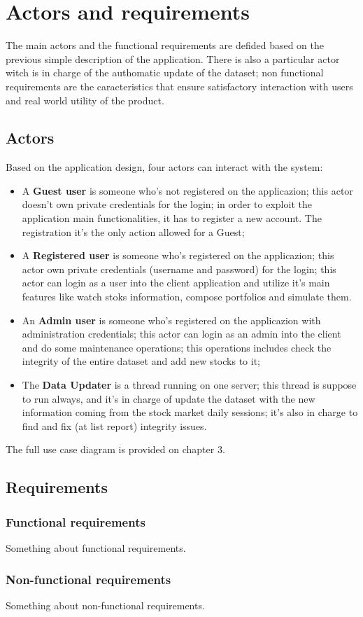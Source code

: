 \chapter{Actors and requirements}
The main actors and the functional requirements are defided based on the previous
simple description of the application. There is also a 
particular actor witch is in charge of the authomatic update of the dataset; non functional
requirements are the caracteristics that ensure satisfactory interaction with users and 
real world utility of the product.

\section{Actors}
Based on the application design, four actors can interact with the system:
\begin{itemize}
    \item A \textbf{Guest user} is someone who's not registered on the applicazion; this actor doesn't 
own private credentials for the login; in order to exploit the application main functionalities, 
it has to register a new account. The registration it's the only action allowed for a Guest;

    \item A \textbf{Registered user} is someone who's registered on the applicazion; this actor own
private credentials (username and password) for the login; this actor can login as a user
into the client
application and utilize it's main features like watch stoks information, compose portfolios and 
simulate them. 
   
    \item An \textbf{Admin user} is someone who's registered on the applicazion with administration
credentials; this actor can login as an admin into the client and do some maintenance 
operations; this operations includes check the integrity of the entire dataset and add new 
stocks to it;

    \item The \textbf{Data Updater} is a thread running on one server; this thread is suppose to 
run always, and it's in charge of update the dataset with the new information coming from 
the stock market daily sessions; it's also in charge to find and fix (at list report)
integrity issues.

\end{itemize}

The full use case diagram is provided on chapter 3.
\section{Requirements}

\subsection{Functional requirements}
Something about functional requirements.

\subsection{Non-functional requirements}
Something about non-functional requirements.
